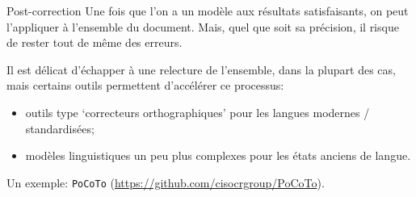 \documentclass[10pt, compress,urlcolor=blue]{beamer}
\begin{document}
\begin{frame}{Post-correction}
	Une fois que l'on a un modèle aux résultats satisfaisants, on peut l'appliquer à l'ensemble du document. Mais, quel que soit sa précision, il risque de rester tout de même des erreurs.
	
	Il est délicat d'échapper à une relecture de l'ensemble, dans la plupart des cas, mais certains outils permettent d'accélérer ce processus:
	
	\begin{itemize}
		\item outils type `correcteurs orthographiques' pour les langues modernes / standardisées;
		\item modèles linguistiques un peu plus complexes pour les états anciens de langue.
	\end{itemize}
	
Un exemple: \texttt{PoCoTo} (\href{https://github.com/cisocrgroup/PoCoTo}{https://github.com/cisocrgroup/PoCoTo}).
	
\end{frame}
\end{document}
